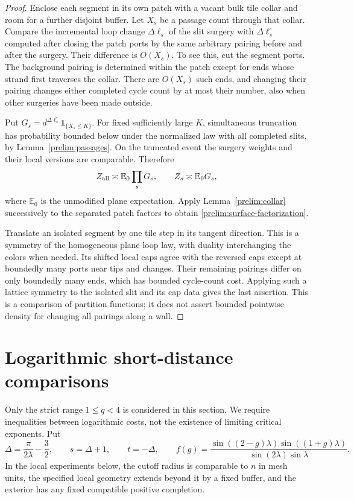 \begin{proof}
Enclose each segment in its own patch with a vacant bulk tile collar and
room for a further disjoint buffer. Let $X_s$ be a passage count through
that collar. Compare the incremental loop change $\Delta\ell_s$ of
the slit surgery with $\Delta\ell_s^\circ$ computed after closing the
patch ports by the same arbitrary pairing before and after the surgery.
Their difference is $O(X_s)$. To see this, cut the segment ports. The
background pairing is determined within the patch except for ends whose
strand first traverses the collar. There are $O(X_s)$ such ends, and
changing their pairing changes either completed cycle count by at most
their number, also when other surgeries have been made outside.

Put $G_s=d^{\Delta\ell_s^\circ}\mathbf1_{\{X_s\le K\}}$.
For fixed sufficiently large $K$, simultaneous truncation has probability
bounded below under the normalized law with all completed slits, by
Lemma~\ref{prelim:passages}. On the truncated event the surgery weights
and their local versions are comparable. Therefore
\[
 Z_{\rm all}\asymp\mathbb E_0\prod_sG_s,
 \qquad Z_s\asymp\mathbb E_0G_s,
\]
where $\mathbb E_0$ is the unmodified plane expectation. Apply
Lemma~\ref{prelim:collar} successively to the separated patch factors
to obtain \eqref{prelim:surface-factorization}.

Translate an isolated segment by one tile step in its tangent direction.
This is a symmetry of the homogeneous plane loop law, with duality
interchanging the colors when needed. Its shifted local caps agree with
the reversed caps except at boundedly many ports near tips and changes.
Their remaining pairings differ on only boundedly many ends, which has
bounded cycle-count cost. Applying such a lattice symmetry to the isolated
slit and its cap data gives the last assertion.
This is a comparison of partition functions; it does not assert bounded
pointwise density for changing all pairings along a wall.
\end{proof}

\section{Logarithmic short-distance comparisons}\label{sec:exponents}

Only the strict range $1\le q<4$ is considered in this section. We require
inequalities between logarithmic costs, not the existence of limiting
critical exponents. Put
\begin{equation}\label{exp:parameters}
 \Delta=\frac{\pi}{2\lambda}-\frac32,\qquad
 s=\Delta+1,\qquad t=-\Delta,\qquad
 f(g)=\frac{\sin((2-g)\lambda)\sin((1+g)\lambda)}
                 {\sin(2\lambda)\sin\lambda}.
\end{equation}
In the local experiments below, the cutoff radius is comparable to $n$
in mesh units, the specified local geometry extends beyond it by a fixed
buffer, and the exterior has any fixed compatible positive completion.

